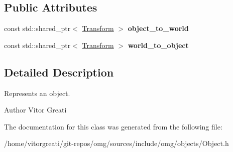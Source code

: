 \subsection*{Public Attributes}
\begin{DoxyCompactItemize}
\item 
\mbox{\label{classomg_1_1_object_ad6bfaee779c617e14437ec3c050af483}} 
const std\+::shared\+\_\+ptr$<$ \mbox{\hyperlink{classomg_1_1_transform}{Transform}} $>$ {\bfseries object\+\_\+to\+\_\+world}
\item 
\mbox{\label{classomg_1_1_object_a7eaa6c2a3d62ee061863b9ad344aec59}} 
const std\+::shared\+\_\+ptr$<$ \mbox{\hyperlink{classomg_1_1_transform}{Transform}} $>$ {\bfseries world\+\_\+to\+\_\+object}
\end{DoxyCompactItemize}


\subsection{Detailed Description}
Represents an object. 

\begin{DoxyAuthor}{Author}
Vitor Greati 
\end{DoxyAuthor}


The documentation for this class was generated from the following file\+:\begin{DoxyCompactItemize}
\item 
/home/vitorgreati/git-\/repos/omg/sources/include/omg/objects/Object.\+h\end{DoxyCompactItemize}
